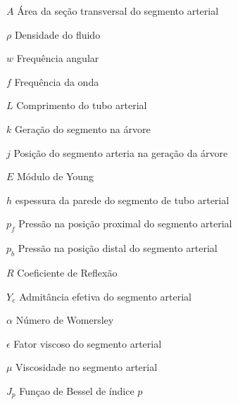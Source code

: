 \documentclass[
        english,			
        brazil			        %
        ,<...>]{abntbibufjf}
\begin{document}
\begin{simbolos}
\item [$A$] Área da seção transversal do segmento arterial \\
\item [$\rho$] Densidade do fluido \\
\item [$w$] Frequência angular \\
\item [$f$] Frequência da onda \\
\item [$L$] Comprimento do tubo arterial \\
\item [$k$] Geração do segmento na árvore \\
\item [$j$] Posição do segmento arteria na geração da árvore \\
\item [$E$] Módulo de Young \\
\item [$h$] espessura da parede do segmento de tubo arterial \\
\item [$p_f$] Pressão na posição proximal do segmento arterial \\
\item [$p_b$] Pressão na posição distal do segmento arterial \\
\item [$R$] Coeficiente de Reflexão \\
\item [$Y_e$] Admitância efetiva do segmento arterial \\
\item [$\alpha$] Número de Womersley \\
\item [$\epsilon$] Fator viscoso do segmento arterial \\
\item [$\mu$] Viscosidade no segmento arterial \\
\item [$J_p$] Funçao de Bessel de índice $p$ \\
 \end{simbolos}

 
\tableofcontents*
\cleardoublepage

\end{document}
